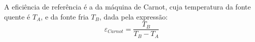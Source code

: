 \documentclass[10pt]{extarticle}
\begin{document}
\begin{multicols}{2}
A eficiência de referência é a da máquina de Carnot, cuja temperatura da fonte quente é $T_A$, e da fonte fria $T_B$, dada pela expressão:
\begin{equation}
\varepsilon_{Carnot} = \frac{T_B}{T_B - T_A}
\end{equation}

\newpage









\end{multicols}
\end{document}

